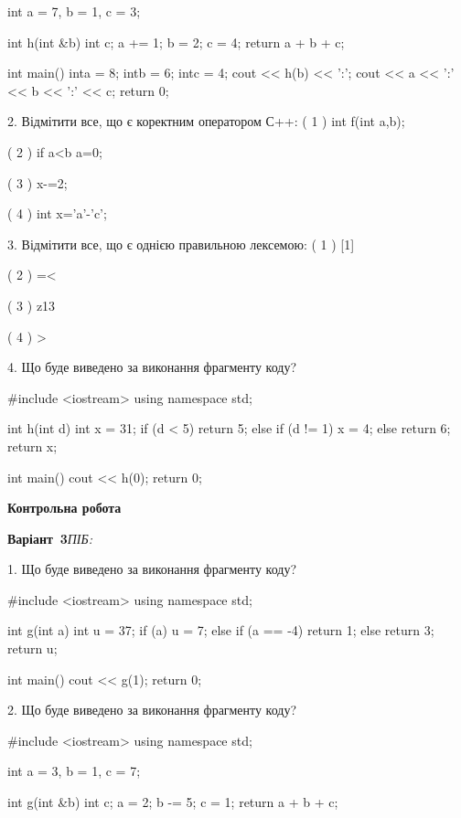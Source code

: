 \documentclass[11pt]{article}
\begin{document}
int a = 7, b = 1, c = 3;

int h(int &b){
int c;    a += 1;
    b = 2;
    c = 4;
    return a + b + c;
}

int main(){
    inta = 8;
    intb = 6;
    intc = 4;
    cout << h(b) << ':';
    cout << a << ':' << b << ':' << c;
    return 0; 
}

2. Відмітити все, що є коректним оператором С++:
( 1 ) int f(int a,b);

( 2 ) if a<b a=0;

( 3 ) x-=2;

( 4 ) int x='a'-'c';

3. Відмітити все, що є однією правильною лексемою:
( 1 ) [1]

( 2 ) =<

( 3 ) z13

( 4 ) >

4. Що буде виведено за виконання фрагменту коду?

#include <iostream>
using namespace std;

int h(int d){
    int x = 31;
    if (d < 5) 
        return 5;
    else if (d != 1)
         x = 4;
    else
         return 6;
    return x;
}

int main(){
    cout << h(0);
    return 0;
}






\newpage
{\large\textbf{Контрольна робота}}

\textbf{Варіант \No\,3}\hfill \textit{ПІБ:}\,\underline{\hspace{60mm}}
\vspace{4mm}

1. Що буде виведено за виконання фрагменту коду?

#include <iostream>
using namespace std;

int g(int a){
    int u = 37;
    if (a) 
        u = 7;
    else if (a == -4)
         return 1;
    else
         return 3;
    return u;
}

int main(){
    cout << g(1);
    return 0;
}


2. Що буде виведено за виконання фрагменту коду?

#include <iostream>
using namespace std;

int a = 3, b = 1, c = 7;

int g(int &b){
int c;    a = 2;
    b -= 5;
    c = 1;
    return a + b + c;
}
\end{document}
